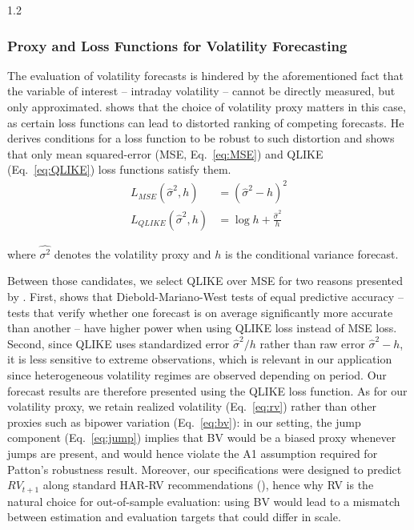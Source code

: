 \documentclass[10pt]{article}
\begin{document}
\begin{setstretch}{1.2}
        \subsubsection{Proxy and Loss Functions for Volatility Forecasting}

The evaluation of volatility forecasts is hindered by the aforementioned fact that the variable of interest -- intraday volatility -- cannot be directly measured, but only approximated. \textcite{Patton2011} shows that the choice of volatility proxy matters in this case, as certain loss functions can lead to distorted ranking of competing forecasts. He derives conditions for a loss function to be robust to such distortion and shows that only mean squared-error (MSE, Eq.~\ref{eq:MSE}) and QLIKE (Eq.~\ref{eq:QLIKE}) loss functions satisfy them.
\begin{align}
    L_{MSE}(\hat{\sigma}^2,h)&=(\hat{\sigma}^2-h)^2 \tag{17} \label{eq:MSE}\\
    L_{QLIKE}(\hat{\sigma}^2,h)&=\log h+\frac{\hat{\sigma}^2}{h} \tag{18} \label{eq:QLIKE}
\end{align}

\noindent where $\hat{\sigma^2}$ denotes the volatility proxy and $h$ is the conditional variance forecast.

Between those candidates, we select QLIKE over MSE for two reasons presented by \textcite{Patton2011}. First, \textcite{Patton2009} shows that Diebold-Mariano-West tests of equal predictive accuracy -- tests that verify whether one forecast is on average significantly more accurate than another --  have higher power when using QLIKE loss instead of MSE loss. Second, since QLIKE uses standardized error $\hat{\sigma}^2 / h$ rather than raw error $\hat{\sigma}^2-h$, it is less sensitive to extreme observations, which is relevant in our application since heterogeneous volatility regimes are observed depending on period. Our forecast results are therefore presented using the QLIKE loss function. As for our volatility proxy, we retain realized volatility (Eq.~\ref{eq:rv}) rather than other proxies such as bipower variation (Eq.~\ref{eq:bv}): in our setting, the jump component (Eq.~\ref{eq:jump}) implies that BV would be a biased proxy whenever jumps are present, and would hence violate the A1 assumption required for Patton's robustness result. Moreover, our specifications were designed to predict $RV_{t+1}$ along standard HAR-RV recommendations (\cite{Corsi2009}), hence why RV is the natural choice for out-of-sample evaluation: using BV would lead to a mismatch between estimation and evaluation targets that could differ in scale. 


\end{setstretch}
\end{document}
